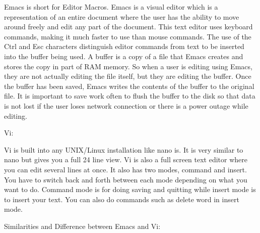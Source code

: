 \documentclass{article} %
\begin{document}
\noindent Emacs is short for Editor Macros. Emacs is a visual editor which is a representation of an entire document where the user has the ability to move around freely and edit any part of the document. This text editor uses keyboard commands, making it much faster to use than mouse commands. The use of the Ctrl and Esc characters distinguish editor commands from text to be inserted into the buffer being used. A buffer is a copy of a file that Emacs creates and stores the copy in part of RAM memory. So when a user is editing using Emacs, they are not actually editing the file itself, but they are editing the buffer. Once the buffer has been saved, Emacs writes the contents of the buffer to the original file. It is important to save work often to flush the buffer to the disk so that data is not lost if the user loses network connection or there is a power outage while editing.

\noindent 

\noindent 

\noindent Vi:

\noindent 

\noindent Vi is built into any UNIX/Linux installation like nano is. It is very similar to nano but gives you a full 24 line view. Vi is also a full screen text editor where you can edit several lines at once. It also has two modes, command and insert. You have to switch back and forth between each mode depending on what you want to do. Command mode is for doing saving and quitting while insert mode is to insert your text. You can also do commands such as delete word in insert mode. 

\noindent 

\noindent 

\noindent Similarities and Difference between Emacs and Vi:

\noindent 

\noindent 
\end{document}
